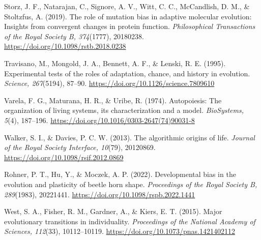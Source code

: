 \documentclass[
  11pt,
]{article}
\begin{document}
Storz, J. F., Natarajan, C., Signore, A. V., Witt, C. C., McCandlish, D.
M., \& Stoltzfus, A. (2019). The role of mutation bias in adaptive
molecular evolution: Insights from convergent changes in protein
function. \emph{Philosophical Transactions of the Royal Society B,
374}(1777), 20180238. \url{https://doi.org/10.1098/rstb.2018.0238}

Travisano, M., Mongold, J. A., Bennett, A. F., \& Lenski, R. E. (1995).
Experimental tests of the roles of adaptation, chance, and history in
evolution. \emph{Science, 267}(5194), 87--90.
\url{https://doi.org/10.1126/science.7809610}

Varela, F. G., Maturana, H. R., \& Uribe, R. (1974). Autopoiesis: The
organization of living systems, its characterization and a model.
\emph{BioSystems, 5}(4), 187--196.
\url{https://doi.org/10.1016/0303-2647(74)90031-8}

Walker, S. I., \& Davies, P. C. W. (2013). The algorithmic origins of
life. \emph{Journal of the Royal Society Interface, 10}(79), 20120869.
\url{https://doi.org/10.1098/rsif.2012.0869}

Rohner, P. T., Hu, Y., \& Moczek, A. P. (2022). Developmental bias in
the evolution and plasticity of beetle horn shape. \emph{Proceedings of
the Royal Society B, 289}(1983), 20221441.
\url{https://doi.org/10.1098/rspb.2022.1441}

West, S. A., Fisher, R. M., Gardner, A., \& Kiers, E. T. (2015). Major
evolutionary transitions in individuality. \emph{Proceedings of the
National Academy of Sciences, 112}(33), 10112--10119.
\url{https://doi.org/10.1073/pnas.1421402112}
\end{document}
